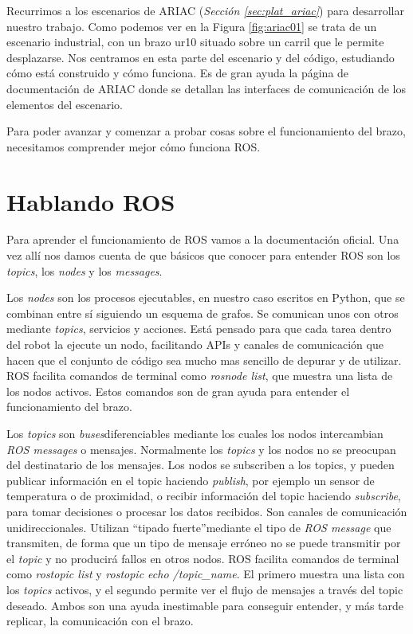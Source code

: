 Recurrimos a los escenarios de ARIAC (\textit{Sección \ref{sec:plat_ariac}}) para desarrollar nuestro trabajo. Como podemos ver en la Figura \ref{fig:ariac01} se trata de un escenario industrial, con un brazo ur10 situado sobre un carril que le permite desplazarse. Nos centramos en esta parte del escenario y del código, estudiando cómo está construido y cómo funciona. Es de gran ayuda la página de documentación de ARIAC\cite{ariacwiki} donde se detallan las interfaces de comunicación de los elementos del escenario.

Para poder avanzar y comenzar a probar cosas sobre el funcionamiento del brazo, necesitamos comprender mejor cómo funciona ROS. 

\section{Hablando ROS}
\label{sec:br_hablandoros}

Para aprender el funcionamiento de ROS vamos a la documentación oficial\cite{roswiki}. Una vez allí nos damos cuenta de que básicos que conocer para entender ROS son los \textit{topics}, los \textit{nodes} y  los \textit{messages}. 

Los \textit{nodes} son los procesos ejecutables, en nuestro caso escritos en Python, que se combinan entre sí siguiendo un esquema de grafos. Se comunican unos con otros mediante \textit{topics}, servicios y acciones. Está pensado para que cada tarea dentro del robot la ejecute un nodo, facilitando APIs y canales de comunicación que hacen que el conjunto de código sea mucho mas sencillo de depurar y de utilizar. ROS facilita comandos de terminal como \textit{rosnode list}, que muestra una lista de los nodos activos. Estos comandos son de gran ayuda para entender el funcionamiento del brazo.

Los \textit{topics} son \textit{buses}diferenciables mediante los cuales los nodos intercambian \textit{ROS messages} o mensajes. Normalmente los \textit{topics} y los nodos no se preocupan del destinatario de los mensajes. Los nodos se subscriben a los topics, y pueden publicar información en el topic haciendo \textit{publish}, por ejemplo un sensor de temperatura o de proximidad, o recibir información del topic haciendo \textit{subscribe}, para tomar decisiones o procesar los datos recibidos. Son canales de comunicación unidireccionales. Utilizan \textquotedblleft tipado fuerte\textquotedblright  mediante el tipo de \textit{ROS message} que transmiten, de forma que un tipo de mensaje erróneo no se puede transmitir por el \textit{topic} y no producirá fallos en otros nodos. ROS facilita comandos de terminal como \textit{rostopic list} y \textit{rostopic echo /topic\_name}. El primero muestra una lista con los \textit{topics} activos, y el segundo permite ver el flujo de mensajes a través del topic deseado. Ambos son una ayuda inestimable para conseguir entender, y más tarde replicar, la comunicación con el brazo.

